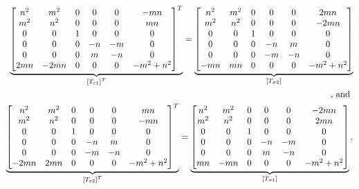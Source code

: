 \documentclass{AeroStructure-ERJohnson}
\begin{document}
\begin{align*}
\underbrace{\left[\begin{array}{@{}cccccc@{}}
n^{2} & m^{2} & 0 & 0 & 0 & -m n\\
m^{2} & n^{2} & 0 & 0 & 0 & m n\\
0 & 0 & 1 & 0 & 0 & 0\\
0 & 0 & 0 & -n & -m & 0\\
0 & 0 & 0 & m & -n & 0\\
2 m n & -2 m n & 0 & 0 & 0 & -m^{2}+n^{2}
\end{array}\right]^T}_{\left[T_{\varepsilon 1}\right]^{T}}
=\underbrace{\left[\begin{array}{@{}cccccc@{}}
n^{2} & m^{2} & 0 & 0 & 0 & 2 m n\\
m^{2} & n^{2} & 0 & 0 & 0 & -2 m n\\
0 & 0 & 1 & 0 & 0 & 0\\
0 & 0 & 0 & -n & m & 0\\
0 & 0 & 0 & -m & -n & 0\\
-m n & m n & 0 & 0 & 0 & -m^{2}+n^{2}
\end{array}\right]}_{\left[T_{\sigma
2}\right]}\\
\mbox{, and }\\
\underbrace{\left[\begin{array}{@{}cccccc@{}}
n^{2} & m^{2} & 0 & 0 & 0 & m n\\
m^{2} & n^{2} & 0 & 0 & 0 & -m n\\
0 & 0 & 1 & 0 & 0 & 0\\
0 & 0 & 0 & -n & m & 0\\
0 & 0 & 0 & -m & -n & 0\\
-2 m n & 2 m n & 0 & 0 & 0 & -m^{2}+n^{2}
\end{array}\right]^T}_{\left[T_{\varepsilon 2}\right]^{T}}
=\underbrace{\left[\begin{array}{@{}cccccc@{}}
n^{2} & m^{2} & 0 & 0 & 0 & -2 m n\\
m^{2} & n^{2} & 0 & 0 & 0 & 2 m n\\
0 & 0 & 1 & 0 & 0 & 0\\
0 & 0 & 0 & -n & -m & 0\\
0 & 0 & 0 & m & -n & 0\\
m n & -m n & 0 & 0 & 0 & -m^{2}+n^{2}
\end{array}\right]}_{\left[T_{\sigma
1}\right]}.
\end{align*}
\end{document}

